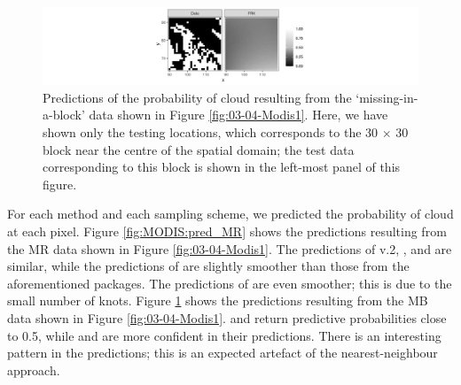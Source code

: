 \documentclass[article]{jss}
\begin{document}
\begin{figure}[t!]
    \centering
    \includegraphics[width = \linewidth]{img/MODIS_block_predictions.png}
     \caption{Predictions of the probability of cloud resulting from the `missing-in-a-block' data shown in Figure \ref{fig:03-04-Modis1}. Here, we have shown only the testing locations, which corresponds to the 30 $\times$ 30 block near the centre of the spatial domain; the test data corresponding to this block is shown in the left-most panel of this figure.}   
  \label{fig:MODIS:pred_block}
\end{figure}










 For each method and each sampling scheme, we predicted the probability of cloud at each pixel. 
 Figure \ref{fig:MODIS:pred_MR} shows the predictions resulting from the MR data shown in Figure \ref{fig:03-04-Modis1}. 
The predictions of  v.2, , and  are similar, 
 while the predictions of  are slightly smoother than those from the aforementioned packages.
 The predictions of  are even smoother; this is due to the small number of knots. 
 Figure \ref{fig:MODIS:pred_block} shows the predictions resulting from the MB data shown in Figure \ref{fig:03-04-Modis1}. 
  and  return predictive probabilities close to 0.5, while  and  are more confident in their predictions. 
 There is an interesting pattern in the  predictions; this is an expected artefact of the nearest-neighbour approach. 
 
 
 
\end{document}
